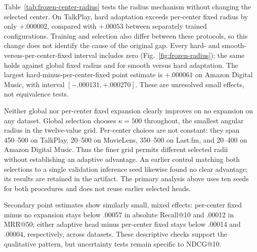 \documentclass[runningheads]{llncs}
\begin{document}
Table~\ref{tab:frozen-center-radius} tests the radius mechanism without changing
the selected center. On TalkPlay, hard adaptation exceeds per-center fixed
radius by only $+.000002$, compared with $+.00053$ between separately trained
configurations. Training and selection also differ between these protocols,
so this change does not identify the cause of the original gap. Every hard-
and smooth-versus-per-center-fixed interval includes zero
(Fig.~\ref{fig:frozen-radius}); the same holds against global fixed radius and
for smooth versus hard adaptation. The largest hard-minus-per-center-fixed
point estimate is $+.000061$ on Amazon Digital Music, with interval
$[-.000131,+.000270]$. These are unresolved small effects, not equivalence tests.

Neither global nor per-center fixed expansion clearly improves on no expansion
on any dataset. Global selection chooses $\kappa=500$ throughout, the smallest
angular radius in the twelve-value grid. Per-center choices are not constant:
they span 450--500 on TalkPlay, 20--500 on MovieLens, 350--500 on Last.fm, and
20--400 on Amazon Digital Music. Thus the finer grid permits different selected
radii without establishing an adaptive advantage. An earlier control matching
both selections to a single validation inference seed likewise found no clear
advantage; its results are retained in the artifact. The primary analysis above
uses ten seeds for both procedures and does not reuse earlier selected heads.

Secondary point estimates show similarly small, mixed effects: per-center
fixed minus no expansion stays below .00057 in absolute Recall@10 and .00012
in MRR@50; either adaptive head minus per-center fixed stays below .00014 and
.00004, respectively, across datasets. These descriptive checks support the
qualitative pattern, but uncertainty tests remain specific to NDCG@10.
\end{document}
